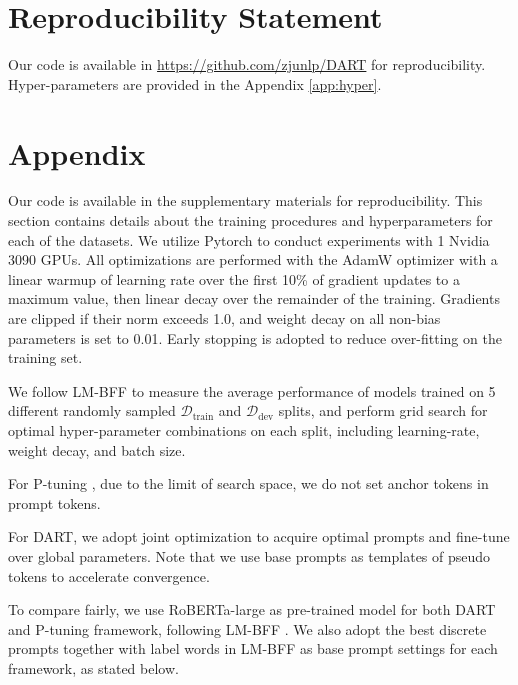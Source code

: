 \documentclass{article} \usepackage{iclr2022_conference,times}
\newcommand{\oursopt}{DART}
\newcommand{\dtrain}{\mathcal{D}_{\text{train}}}
\newcommand{\ddev}{\mathcal{D}_{\text{dev}}}
\begin{document}
\section*{Reproducibility Statement}
Our code is available in \url{https://github.com/zjunlp/DART} for reproducibility.
Hyper-parameters are provided in the Appendix \ref{app:hyper}.








\appendix
\section{Appendix}

Our code is available in the supplementary materials for reproducibility.
This section contains details about the training procedures and hyperparameters for each of the datasets. 
We utilize Pytorch \citep{DBLP:conf/nips/PaszkeGMLBCKLGA19} to conduct experiments with 1 Nvidia 3090 GPUs. 
All optimizations are performed with the AdamW optimizer with a linear warmup of learning rate over the first 10\% of gradient updates to a maximum value, then linear decay over the remainder of the training. 
Gradients are clipped if their norm exceeds 1.0, and weight decay on all non-bias parameters is set to 0.01. 
Early stopping is adopted to reduce over-fitting on the training set.

We follow LM-BFF \citep{DBLP:journals/corr/abs-2012-15723} to measure the average performance of models trained on 5 different randomly sampled $\dtrain$ and $\ddev$ splits, and perform grid search for optimal hyper-parameter combinations on each split, including learning-rate, weight decay, and batch size.

For P-tuning \citep{DBLP:journals/corr/abs-2103-10385}, due to the limit of search space, we do not set anchor tokens in prompt tokens.
 
For {\oursopt}, we adopt joint optimization to acquire optimal prompts and fine-tune over global parameters. 
Note that we use base prompts as templates of pseudo tokens to accelerate convergence.
 
To compare fairly, we use RoBERTa-large \citep{DBLP:journals/corr/abs-1907-11692} as pre-trained model for both {\oursopt} and P-tuning framework, following LM-BFF \citep{DBLP:journals/corr/abs-2012-15723}. 
We also adopt the best discrete prompts together with label words in LM-BFF as base prompt settings for each framework, as stated below.
 
\end{document}
